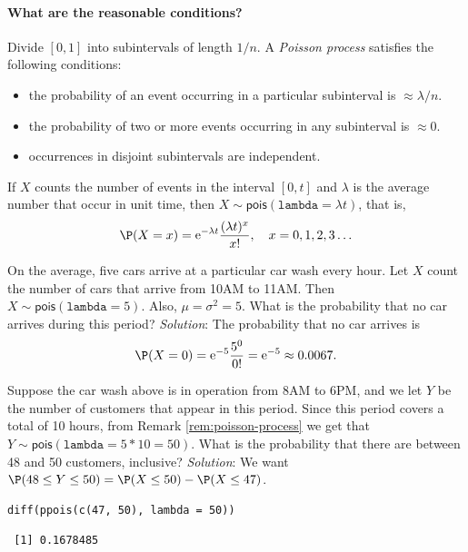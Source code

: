 \documentclass[captions=tableheading]{scrbook}
\begin{document}
\paragraph*{What are the reasonable conditions?}

Divide \([0,1]\) into subintervals of length \(1/n\). A \emph{Poisson process} satisfies the following conditions:
\begin{itemize}
\item the probability of an event occurring in a particular subinterval is \(\approx\lambda/n\).
\item the probability of two or more events occurring in any subinterval is \(\approx 0\).
\item occurrences in disjoint subintervals are independent.
\end{itemize}

\begin{rem}
\label{rem:poisson-process}

If \(X\) counts the number of events in the interval \([0,t]\) and \(\lambda\) is the average number that occur in unit time, then \(X\sim\mathsf{pois}(\mathtt{lambda}=\lambda t)\), that is,
\begin{equation}
\P(X=x)=\mathrm{e}^{-\lambda t}\frac{(\lambda t)^{x}}{x!},\quad x=0,1,2,3\ldots
\end{equation}
\end{rem}

\begin{example}
On the average, five cars arrive at a particular car wash every hour. Let \(X\) count the number of cars that arrive from 10AM to 11AM. Then \(X\sim\mathsf{pois}(\mathtt{lambda}=5)\). Also, \(\mu=\sigma^{2}=5\). What is the probability that no car arrives during this period? 
\emph{Solution}: The probability that no car arrives is
\[
\P(X=0)=\mathrm{e}^{-5}\frac{5^{0}}{0!}=\mathrm{e}^{-5}\approx0.0067.
\]
\end{example}

\begin{example}
Suppose the car wash above is in operation from 8AM to 6PM, and we let \(Y\) be the number of customers that appear in this period. Since this period covers a total of 10 hours, from Remark \ref{rem:poisson-process} we get that \(Y\sim\mathsf{pois}(\mathtt{lambda}=5\ast10=50)\). What is the probability that there are between 48 and 50 customers, inclusive? 
\emph{Solution}: We want \(\P(48\leq Y\leq50)=\P(X\leq50)-\P(X\leq47)\). 


\begin{verbatim}
diff(ppois(c(47, 50), lambda = 50))
\end{verbatim}

\begin{verbatim}
 [1] 0.1678485
\end{verbatim}

\end{example}
\end{document}
